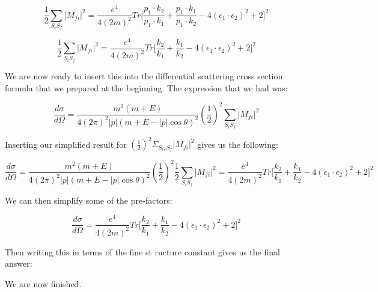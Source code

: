 \documentclass[a4]{article}
\begin{document}
    \begin{equation}
        \frac{1}{2} \sum_{S_i S_f} |M_{fi}|^2 = \frac{e^4}{4 (2m)^2} Tr \Bigg[ \frac{p_1 \cdot k_2}{p_1 \cdot k_1} + \frac{p_1 \cdot k_1}{p_1 \cdot k_2} - 4 (\epsilon_1 \cdot \epsilon_2)^2 + 2 \Bigg]^2
    \end{equation}

    \begin{equation}
        \frac{1}{2} \sum_{S_i S_f} |M_{fi}|^2 = \frac{e^4}{4 (2m)^2} Tr \Bigg[ \frac{k_2}{k_1} + \frac{k_1}{k_2} - 4 (\epsilon_1 \cdot \epsilon_2)^2 + 2 \Bigg]^2
    \end{equation}

    We are now ready to insert this into the differential scattering cross section formula that we prepared at the beginning. The expression that we had was:

    \begin{equation}
        \frac{d \sigma}{d \Omega} = \frac{m^2 (m + E)}{4 (2 \pi)^2 |p| (m + E - |p| \cos \theta)^2} (\frac{1}{2})^2 \sum_{S_i S_f} |M_{fi}|^2
    \end{equation}

    Inserting our simplified result for $(\frac{1}{2})^2 \Sigma_{S_i, S_f} |M_{fi}|^2$ gives us the following:

    \begin{equation}
        \frac{d \sigma}{d \Omega} = \frac{m^2 (m + E)}{4 (2 \pi)^2 |p| (m + E - |p| \cos \theta)^2} (\frac{1}{2})^2 \frac{1}{2} \sum_{S_i S_f} |M_{fi}|^2 = \frac{e^4}{4 (2m)^2} Tr \Bigg[ \frac{k_2}{k_1} + \frac{k_1}{k_2} - 4 (\epsilon_1 \cdot \epsilon_2)^2 + 2 \Bigg]^2
    \end{equation}

    We can then simplify some of the pre-factors:

    \begin{equation}
        \frac{d \sigma}{d \Omega} = \frac{e^4}{4 (2m)^2} Tr \Bigg[ \frac{k_2}{k_1} + \frac{k_1}{k_2} - 4 (\epsilon_1 \cdot \epsilon_2)^2 + 2 \Bigg]^2
    \end{equation}

    Then writing this in terms of the fine st ructure constant gives us the final answer:

    \begin{center}
    \end{center}

    We are now finished.
\end{document}
